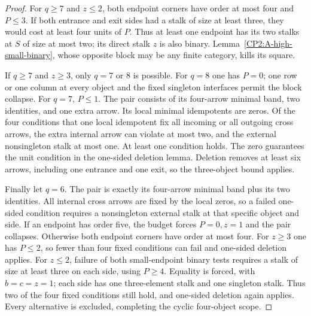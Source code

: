 \begin{proof}
For $q\ge7$ and $z\le2$, both endpoint corners have
order at most four and $P\le3$. If both entrance
and exit sides had a stalk of size at least three,
they would cost at least four units of $P$. Thus at
least one endpoint has its two stalks at $S$ of size
at most two; its direct stalk $z$ is also binary.
Lemma~\ref{CP2:A-high-small-binary}, whose opposite
block may be any finite category, kills its square.

If $q\ge7$ and $z\ge3$, only $q=7$ or $8$ is possible.
For $q=8$ one has $P=0$; one row or one column at every
object and the fixed singleton interfaces permit the
block collapse. For $q=7$, $P\le1$. The pair consists
of its four-arrow minimal band, two identities, and
one extra arrow. Its local minimal idempotents are
zeros. Of the four conditions that one local idempotent
fix all incoming or all outgoing cross arrows, the
extra internal arrow can violate at most two, and
the external nonsingleton stalk at most one. At least
one condition holds. The zero guarantees the unit
condition in the one-sided deletion lemma. Deletion
removes at least six arrows, including one entrance
and one exit, so the three-object bound applies.

Finally let $q=6$. The pair is exactly its four-arrow
minimal band plus its two identities. All internal
cross arrows are fixed by the local zeros, so a failed
one-sided condition requires a nonsingleton external
stalk at that specific object and side. If an endpoint
has order five, the budget forces $P=0,z=1$ and the
pair collapses. Otherwise both endpoint corners have
order at most four. For $z\ge3$ one has $P\le2$,
so fewer than four fixed conditions can fail and
one-sided deletion applies. For $z\le2$, failure
of both small-endpoint binary tests requires a stalk
of size at least three on each side, using $P\ge4$.
Equality is forced, with $b=c=z=1$; each side has
one three-element stalk and one singleton stalk.
Thus two of the four fixed conditions still hold,
and one-sided deletion again applies. Every alternative
is excluded, completing the cyclic four-object scope.
\end{proof}
